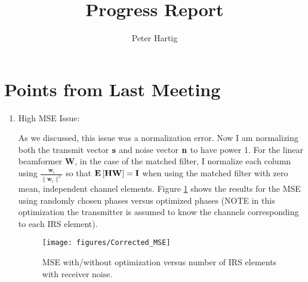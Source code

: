 \documentclass[12pt,a4paper]{report}
\title{Progress Report}
\author{Peter Hartig}
\begin{document}
\maketitle
\tableofcontents
\section{Points from Last Meeting}
\begin{enumerate}
\item{High MSE Issue:} \par
	As we discussed, this issue was a normalization error. Now I am normalizing both the transmit vector $\mathbf{s}$  and noise vector $\mathbf{n}$ to have power 1. 
	For the linear beamformer $\mathbf{W}$, in the case of the matched filter, I normalize each column using $\frac{\mathbf{w}_i}{\|\mathbf{w}_i\|^2}$ so that
	$\mathop{\bf E{}}\left[\mathbf{H}\mathbf{W}\right] = \mathbf{I}$ when using the matched filter with zero mean, independent channel elements.
	Figure  \ref{MSE_opt_noise} shows the results for the MSE using randomly chosen phases versus  optimized phases (NOTE in this optimization the transmitter is assumed to 		know the channels corresponding to each IRS element).
	\begin{figure}[H]
	\texttt{[image: figures/Corrected\_MSE]}
	  \caption{MSE with/without optimization versus number of IRS elements with receiver noise.}
	  	  \label{MSE_opt_noise}
	\end{figure}	
	

\end{enumerate}
\end{document}
